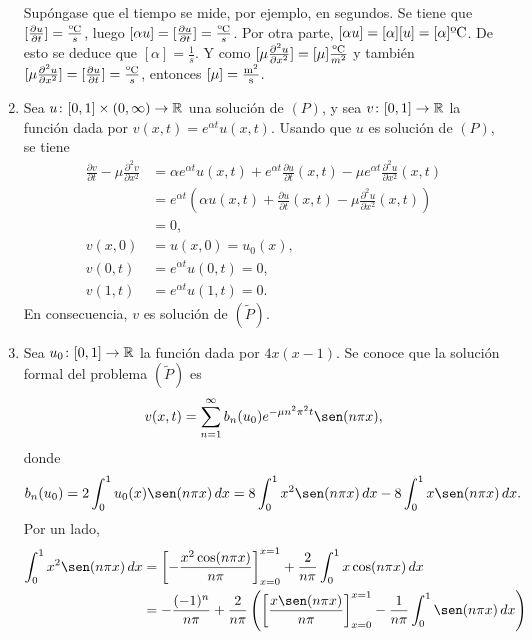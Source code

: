 \documentclass[11pt]{report}
\begin{document}
\begin{solution}
\begin{enumerate}
        Supóngase que el tiempo se mide, por ejemplo, en segundos. Se tiene que $[\frac{\partial u}{\partial t}] = \frac{\textup{ºC}}{s}$, luego $[\alpha u] = [\frac{\partial u}{\partial t}] = \frac{\textup{ºC}}{s}$. Por otra parte, $[\alpha u] = [\alpha][u] = [\alpha]\textup{ºC}$. De esto se deduce que $[\alpha] = \frac{1}{s}$. Y como $[\mu\frac{\partial^2u}{\partial x^2}] = [\mu]\frac{\textup{ºC}}{m^2}$ y también $[\mu\frac{\partial^2u}{\partial x^2}] = [\frac{\partial u}{\partial t}] = \frac{\textup{ºC}}{s}$, entonces $[\mu] = \frac{\textup{m}^2}{\textup{s}}$.
        \item Sea $u \colon [0,1]\times(0,\infty)\to\mathbb R$ una solución de $(P)$, y sea $v \colon [0,1]\to\mathbb R$ la función dada por $v(x,t) = e^{\alpha t}u(x,t)$. Usando que $u$ es solución de $(P)$, se tiene
        \begin{align*}
            \frac{\partial v}{\partial t} - \mu\frac{\partial^2v}{\partial x^2} &= \alpha e^{\alpha t}u(x,t) + e^{\alpha t}\frac{\partial u}{\partial t}(x,t)-\mu e^{\alpha t}\frac{\partial^2u}{\partial x^2}(x,t) \\
            &= e^{\alpha t}\left(\alpha u(x,t)+\frac{\partial u}{\partial t}(x,t) -\mu\frac{\partial^2u}{\partial x^2}(x,t)\right) \\
            &= 0, \\
            v(x,0) &= u(x,0) = u_0(x), \\
            v(0,t) &= e^{\alpha t}u(0,t) = 0,\\
            v(1,t) &= e^{\alpha t}u(1,t) = 0.
        \end{align*}
        En consecuencia, $v$ es solución de $(\widetilde{P})$. 
        \item Sea $u_0\colon[0,1]\to\mathbb R$ la función dada por $4x(x-1)$. Se conoce que la solución formal del problema $(\widetilde{P})$ es
        \[v(x,t) = \sum_{n=1}^\infty b_n(u_0)e^{-\mu n^2\pi^2 t}\sen(n\pi x),\]
        donde
        \begin{align*}
            b_n(u_0) &= 2\int_0^1 u_0(x)\sen(n\pi x)\, dx = 8\int_0^1x^2\sen(n\pi x)\, dx-8\int_0^1x\sen(n\pi x)\, dx. \\
        \end{align*}
        Por un lado,
        \begin{align*}
            \int_0^1x^2\sen(n\pi x)\, dx &= \left[-\frac{x^2\cos(n\pi x)}{n\pi}\right]_{x=0}^{x=1}+\frac{2}{n\pi}\int_0^1x\cos(n\pi x)\, dx \\
            &= -\frac{(-1)^n}{n\pi} + \frac{2}{n\pi}\left(\left[\frac{x\sen(n\pi x)}{n\pi}\right]_{x=0}^{x=1}-\frac{1}{n\pi}\int_0^1\sen(n\pi x)\, dx\right) \\

\end{align*}
\end{enumerate}
\end{solution}
\end{document}
